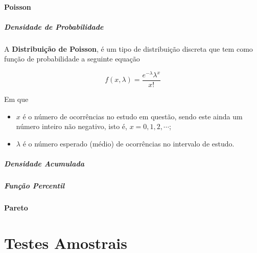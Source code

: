 \documentclass[
]{book}
\begin{document}
\hypertarget{poisson}{%
\subsection{Poisson}\label{poisson}}

\hypertarget{densidade-de-probabilidade-3}{%
\subsubsection*{Densidade de Probabilidade}\label{densidade-de-probabilidade-3}}

A \textbf{Distribuição de Poisson}, é um tipo de distribuição discreta que tem como função de probabilidade a seguinte equação

\begin{equation}
f(x,\lambda) = \frac{e^{-\lambda} \lambda^x}{x!}
\end{equation}

Em que

\begin{itemize}
\item
  \(x\) é o número de ocorrências no estudo em questão, sendo este ainda um número inteiro não negativo, isto é, \(x = 0, 1, 2, \cdots\);
\item
  \(\lambda\) é o número esperado (médio) de ocorrências no intervalo de estudo.
\end{itemize}

\hypertarget{densidade-acumulada-3}{%
\subsubsection*{Densidade Acumulada}\label{densidade-acumulada-3}}

\hypertarget{funuxe7uxe3o-percentil-3}{%
\subsubsection*{Função Percentil}\label{funuxe7uxe3o-percentil-3}}

\hypertarget{pareto}{%
\subsection{Pareto}\label{pareto}}

\hypertarget{part-testes-amostrais}{%
\part{Testes Amostrais}\label{part-testes-amostrais}}
\end{document}
